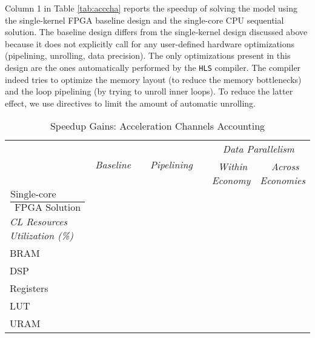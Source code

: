 \documentclass[12pt,american]{article}
\newcommand{\resultsfolder}{./results}
\newcommand{\devfpgaI}{fpgaI}
\newcommand{\devcpu}{cpu-cores}
\newcommand{\nKMIkI}{nKM4-nk100}
\newcommand{\knlI}{knl-1}
\newcommand{\cpucoreI}{1}
\newcommand{\fpgaspeedICPUI}{}
\newcommand{\fpgaspeedIknlICPUInKMIkI}{}
\newcommand{\fpgaIbasespeedcpuIbasenKMIkI}{}
\newcommand{\fpgaIpipspeedcpuIbasenKMIkI}{}
\newcommand{\baselineBRAM}{}
\newcommand{\baselineDSP}{}
\newcommand{\baselineRegisters}{}
\newcommand{\baselineLUTs}{}
\newcommand{\baselineURAM}{}
\newcommand{\pipelinenBRAM}{}
\newcommand{\pipelineDSP}{}
\newcommand{\pipelineRegisters}{}
\newcommand{\pipelineLUTs}{}
\newcommand{\pipelineURAM}{}
\newcommand{\withindataparallelBRAM}{}
\newcommand{\withindataparallelDSP}{}
\newcommand{\withindataparallelRegisters}{}
\newcommand{\withindataparallelLUTs}{}
\newcommand{\withindataparallelURAM}{}
\newcommand{\acrossdataparallelBRAM}{}
\newcommand{\acrossdataparallelDSP}{}
\newcommand{\acrossdataparallelRegisters}{}
\newcommand{\acrossdataparallelLUTs}{}
\newcommand{\acrossdataparallelURAM}{}
\begin{document}
Column 1 in Table \ref{tab:acccha} reports the speedup of solving the model using the single-kernel FPGA baseline design and the single-core CPU sequential solution. The baseline design differs from the single-kernel design discussed above because it does not explicitly call for any user-defined hardware optimizations (pipelining, unrolling, data precision). The only optimizations present in this design are the ones automatically performed by the \texttt{HLS} compiler. The compiler indeed tries to optimize the memory layout (to reduce the memory bottlenecks) and the loop pipelining (by trying to unroll inner loops). To reduce the latter effect, we use directives to limit the amount of automatic unrolling.

\newcommand{\xx}{0.22in}
\begin{table}[ht!]
\setlength\tabcolsep{0pt}
\caption{Speedup Gains: Acceleration Channels Accounting}
\vspace{-0.1in}
\begin{center}
\begin{tabular}{l@{\hskip \xx}c@{\hskip \xx}c@{\hskip \xx} c@{\hskip \xx}c@{\hskip \xx}c@{\hskip \xx} c@{\hskip \xx}}
\toprule
&
\multirow{2}{*}{\textit{Baseline}}&&
\multirow{2}{*}{\textit{Pipelining}} && 
\multicolumn{2}{c}{\textit{Data Parallelism}}\\
\cmidrule{6-7}
&&&&
&\parbox[c]{1.5cm}{\,\,\textit{Within}\\ \textit{Economy}}
&\parbox[c]{1.5cm}{\,\,\,\textit{Across}\\ \textit{Economies}}\\
\parbox[l][1.cm]{3.7cm}{
\footnotesize{$\dfrac{\text{Single-core Execution}}{\text{FPGA Solution}}$}}
&\fpgaIbasespeedcpuIbasenKMIkI&&
\fpgaIpipspeedcpuIbasenKMIkI&&
\fpgaspeedIknlICPUInKMIkI&
\fpgaspeedICPUI\\
\textit{CL Resources Utilization (\%)}\\
BRAM&\baselineBRAM &&\pipelinenBRAM &&\withindataparallelBRAM &\acrossdataparallelBRAM \\
DSP&\baselineDSP&&\pipelineDSP &&\withindataparallelDSP &\acrossdataparallelDSP \\
Registers&\baselineRegisters&&\pipelineRegisters &&\withindataparallelRegisters &\acrossdataparallelRegisters \\
LUT&\baselineLUTs&&\pipelineLUTs &&\withindataparallelLUTs &\acrossdataparallelLUTs \\
URAM&\baselineURAM&&\pipelineURAM &&\withindataparallelURAM &\acrossdataparallelURAM \\

\end{tabular}
\end{center}
\end{table}
\end{document}
